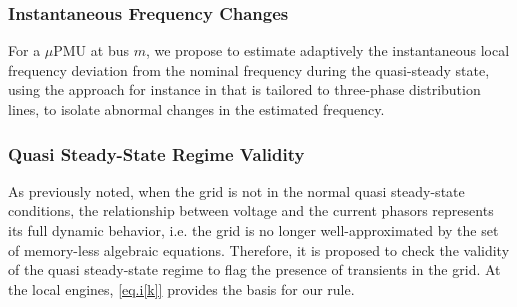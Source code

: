 \documentclass[twocolumn]{IEEEtran}
\newcommand{\mup}{\mu \text{PMU}}
\begin{document}

\subsubsection{Instantaneous Frequency Changes} For a $\mup$ at bus $m$, we propose to estimate adaptively the instantaneous local frequency deviation from the nominal frequency during the quasi-steady state, using the approach for instance in \cite{xia2012widely} that is tailored to three-phase distribution lines, to isolate abnormal changes in the estimated frequency. 
%
 
\subsubsection{Quasi Steady-State Regime Validity}
As previously noted, when the grid is not in the normal quasi steady-state conditions, the relationship between voltage and the current phasors represents its full dynamic behavior, i.e. the grid is no longer well-approximated by the set of memory-less algebraic equations. Therefore, it is proposed to check the validity of the quasi steady-state regime to flag the presence of transients in the grid. 
At the local engines, \eqref{eq.i[k]} provides the basis for our rule.
 
\end{document}
